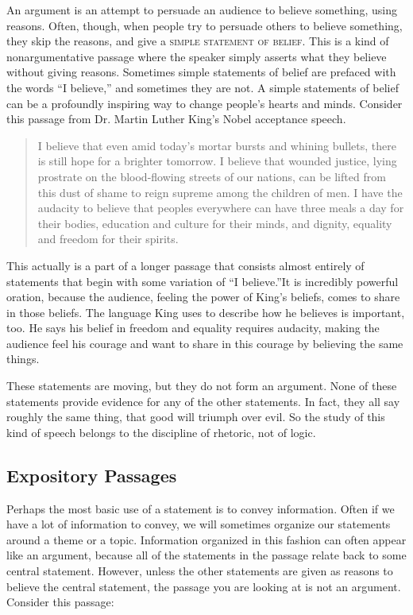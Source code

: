 An argument is an attempt to persuade an audience to believe something, using reasons. Often, though, when people try to persuade others to believe something, they skip the reasons, and give a \textsc{\gls{simple statement of belief}}. \label{def:simple_statement_of_belief} This is a kind of nonargumentative passage where the speaker simply asserts what they believe without giving reasons. Sometimes simple statements of belief are prefaced with the words ``I believe,'' and sometimes they are not. A simple statements of belief can be a profoundly inspiring way to change people's hearts and minds. Consider this passage from Dr. Martin Luther King's Nobel acceptance speech.

\begin{quotation} \noindent I believe that even amid today's mortar bursts and whining bullets, there is still hope for a brighter tomorrow. I believe that wounded justice, lying prostrate on the blood-flowing streets of our nations, can be lifted from this dust of shame to reign supreme among the children of men. I have the audacity to believe that peoples everywhere can have three meals a day for their bodies, education and culture for their minds, and dignity, equality and freedom for their spirits. \citep{King1964} \end{quotation}

This actually is a part of a longer passage that consists almost entirely of statements that begin with some variation of ``I believe.''It is incredibly powerful oration, because the audience, feeling the power of King's beliefs, comes to share in those beliefs. The language King uses to describe how he believes is important, too. He says his belief in freedom and equality requires audacity, making the audience feel his courage and want to share in this courage by believing the same things. 

These statements are moving, but they do not form an argument. None of these statements provide evidence for any of the other statements. In fact, they all say roughly the same thing, that good will triumph over evil. So the study of this kind of speech belongs to the discipline of rhetoric, not of logic.  
  
\subsection{Expository Passages}

Perhaps the most basic use of a statement is to convey information. Often if we have a lot of information to convey, we will sometimes organize our statements around a theme or a topic. Information organized in this fashion can often appear like an argument, because all of the statements in the passage relate back to some central statement. However, unless the other statements are given as reasons to believe the central statement, the passage you are looking at is not an argument. Consider this passage:

